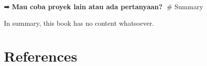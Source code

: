 \documentclass[
  letterpaper,
  DIV=11,
  numbers=noendperiod]{scrreprt}
\newlength{\cslhangindent}
\newenvironment{CSLReferences}[2] %
 {\begin{list}{}{%
  \setlength{\itemindent}{0pt}
  \setlength{\leftmargin}{0pt}
  \setlength{\parsep}{0pt}
  \ifodd #1
   \setlength{\leftmargin}{\cslhangindent}
   \setlength{\itemindent}{-1\cslhangindent}
  \fi
  \setlength{\itemsep}{#2\baselineskip}}}
 {\end{list}}
\begin{document}
➡ \textbf{Mau coba proyek lain atau ada pertanyaan?} 🚀\# Summary

In summary, this book has no content whatsoever.


\chapter*{References}\label{references}


\label{refs}
\begin{CSLReferences}{0}{1}
\end{CSLReferences}
\end{document}
